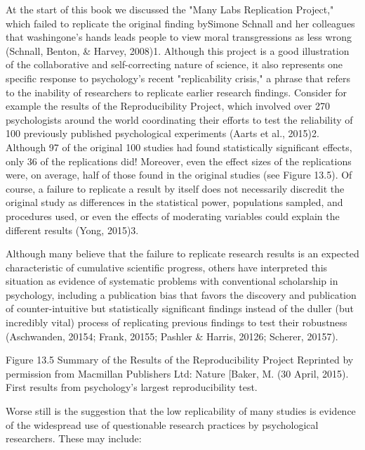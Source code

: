 At the start of this book we discussed the "Many Labs Replication Project," which failed to replicate the original finding bySimone Schnall and her colleagues that washingone's hands leads people to view moral transgressions as less wrong (Schnall, Benton, \& Harvey, 2008)1. Although this project is a good illustration of the collaborative and self-correcting nature of science, it also represents one specific response to psychology's recent "replicability crisis," a phrase that refers to the inability of researchers to replicate earlier research findings. Consider for example the results of the Reproducibility Project, which involved over 270 psychologists around the world coordinating their efforts to test the reliability of 100 previously published psychological experiments (Aarts et al., 2015)2. Although 97 of the original 100 studies had found statistically significant effects, only 36 of the replications did! Moreover, even the effect sizes of the replications were, on average, half of those found in the original studies (see Figure 13.5). Of course, a failure to replicate a result by itself does not necessarily discredit the original study as differences in the statistical power, populations sampled, and procedures used, or even the effects of moderating variables could explain the different results (Yong, 2015)3.


Although many believe that the failure to replicate research results is an expected characteristic of cumulative scientific progress, others have interpreted this situation as evidence of systematic problems with conventional scholarship in psychology, including a publication bias that favors the discovery and publication of counter-intuitive but statistically significant findings instead of the duller (but incredibly vital) process of replicating previous findings to test their robustness (Aschwanden, 20154; Frank, 20155; Pashler \& Harris, 20126; Scherer, 20157).

Figure 13.5 Summary of the Results of the Reproducibility Project Reprinted by permission from Macmillan Publishers Ltd: Nature [Baker, M. (30 April, 2015). First results from psychology's largest reproducibility test. 

Worse still is the suggestion that the low replicability of many studies is evidence of the widespread use of questionable research practices by psychological researchers. These may include:


